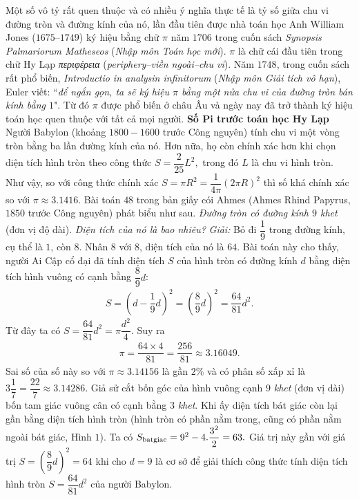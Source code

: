 \begin{multicols}{2}
	Một số vô tỷ rất quen thuộc và có nhiều ý nghĩa thực tế là tỷ số giữa chu vi đường tròn và đường kính của nó, lần đầu tiên được nhà toán học Anh William Jones ($1675–1749$) ký hiệu bằng chữ $\pi$  năm $1706$  trong cuốn sách \textit{Synopsis Palmariorum Matheseos} (\textit{Nhập môn Toán học mới}).  $\pi$ là chữ cái đầu tiên trong chữ Hy Lạp \textit{περιφέρεια} (\textit{periphery--viền ngoài--chu vi}). Năm $1748$, trong cuốn sách rất phổ biến, \textit{Introductio in analysin infinitorum} (\textit{Nhập môn Giải tích vô hạn}), Euler viết: ``\textit{để ngắn gọn, ta sẽ ký hiệu $\pi$ bằng một nửa chu vi của đường tròn bán kính bằng $1$}". Từ đó $\pi$ được phổ biến ở châu Âu và ngày nay đã trở thành ký hiệu toán học quen thuộc với tất cả mọi người.
	\vskip 0.1cm
	\textbf{\color{lichsutoanhoc}Số Pi trước toán học Hy Lạp}
	\vskip 0.1cm
	Người Babylon (khoảng $1800-1600$ trước Công nguyên) tính chu vi một vòng tròn bằng ba lần đường kính của nó. Hơn nữa, họ còn chính xác hơn khi chọn diện tích hình tròn theo công thức $S = \dfrac{2}{{25}}{L^2},$  trong đó $L$  là chu vi hình tròn. Như vậy, so với công thức chính xác $S = \pi {R^2} = \dfrac{1}{{4\pi }}{\left( {2\pi R} \right)^2}$  thì số  khá chính xác so với $\pi  \approx 3.1416$.
	\vskip 0.1cm
	Bài toán $48$ trong bản giấy cói Ahmes (Ahmes Rhind Papyrus, $1850$ trước Công nguyên) phát biểu như sau. \textit{Đường tròn có đường kính $9$ khet} (đơn vị độ dài). \textit{Diện tích của nó là bao nhiêu?}
	\vskip 0.1cm
	\textit{Giải:} Bỏ đi $\dfrac{1}{9}$ trong đường kính, cụ thể là $1$, còn $8$. Nhân $8$ với $8$, diện tích của nó là $64$.
	\vskip 0.1cm 
	Bài toán này cho thấy, người Ai Cập cổ đại đã tính diện tích  $S$ của hình tròn có đường kính $d$ bằng diện tích hình vuông có cạnh bằng $\dfrac{8}{9}d$:  
	\begin{align*}
		S = {\left( {d - \dfrac{1}{9}d} \right)^2} = {\left( {\dfrac{8}{9}d} \right)^2} = \dfrac{{64}}{{81}}{d^2}.
	\end{align*}
	Từ đây ta có  $S = \dfrac{{64}}{{81}}{d^2} = \pi \dfrac{{{d^2}}}{4}$. Suy ra
	\begin{align*}
		\pi  = \dfrac{{64 \times 4}}{{81}} = \dfrac{{256}}{{81}} \approx 3.16049.
	\end{align*}
	Sai số của số này so với  $\pi  \approx 3.14156$ là gần $2\%$ và có phân số xấp xỉ là $3\dfrac{1}{7} = \dfrac{{22}}{7} \approx 3.14286$.
	\vskip 0.1cm 
	Giả sử cắt bốn góc của hình vuông cạnh $9$ \textit{khet} (đơn vị dài) bốn tam giác vuông cân có cạnh bằng $3$ \textit{khet}. Khi ấy diện tích bát giác còn lại gần bằng diện tích hình tròn (hình tròn có phần nằm trong, cũng có phần nằm ngoài bát giác, Hình $1$). Ta có ${S_{{\rm{batgiac}}}} = {9^2} - 4.\dfrac{{{3^2}}}{2} = 63.$   
	Giá trị này gần với giá trị  $S = {\left( {\dfrac{8}{9}d} \right)^2} = 64$ khi cho $d = 9$  là cơ sở để giải thích công thức tính diện tích hình tròn $S = \dfrac{{64}}{{81}}{d^2}$  của người Babylon.	 
	

\end{multicols}

